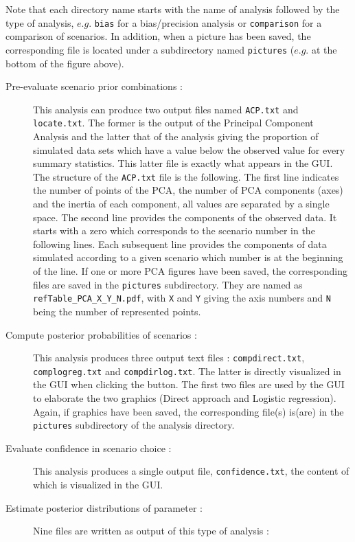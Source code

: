 Note that each directory name starts with the name of analysis followed
by the type of analysis, $e.g.$ \texttt{bias} for a bias/precision
analysis or \texttt{comparison} for a comparison of scenarios. In
addition, when a picture has been saved, the corresponding file is
located under a subdirectory named \texttt{pictures} ($e.g.$ at the
bottom of the figure above).
\begin{description}
\item [{Pre-evaluate scenario prior combinations :}] This analysis can
produce two output files named \texttt{ACP.txt} and \texttt{locate.txt}.
The former is the output of the Principal Component Analysis and the
latter that of the analysis giving the proportion of simulated data
sets which have a value below the observed value for every summary
statistics. This latter file is exactly what appears in the GUI. The
structure of the \texttt{ACP.txt} file is the following. The first
line indicates the number of points of the PCA, the number of PCA
components (axes) and the inertia of each component, all values are
separated by a single space. The second line provides the components
of the observed data. It starts with a zero which corresponds to the
scenario number in the following lines. Each subsequent line provides
the components of data simulated according to a given scenario which
number is at the beginning of the line. If one or more PCA figures
have been saved, the corresponding files are saved in the \texttt{pictures}
subdirectory. They are named as \texttt{refTable\_PCA\_X\_Y\_N.pdf},
with \texttt{X} and \texttt{Y} giving the axis numbers and \texttt{N}
being the number of represented points.
\item [{Compute posterior probabilities of scenarios :}] This analysis
produces three output text files : \texttt{compdirect.txt}, \texttt{complogreg.txt}
and \texttt{compdirlog.txt}. The latter is directly visualized in
the GUI when clicking the 
button. The first two files are used by the GUI to elaborate the two
graphics (Direct approach and Logistic regression). Again, if graphics
have been saved, the corresponding file(s) is(are) in the \texttt{pictures}
subdirectory of the analysis directory.
\item [{Evaluate confidence in scenario choice :}] This analysis produces
a single output file, \texttt{confidence.txt}, the content of which
is visualized in the GUI.
\item [{Estimate posterior distributions of parameter :}] Nine files are
written as output of this type of analysis :


\end{description}
